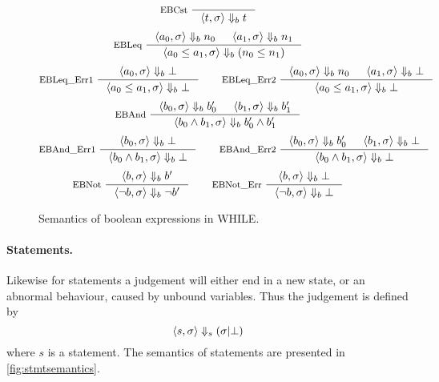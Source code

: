 \begin{figure}[h!]
\begin{equation*}
\inference[EBCst ]{}
{\judgeb{t,\sigma}{t}}
\end{equation*}
\begin{equation*}
\inference[EBLeq ]{\judgeb{a_0,\sigma}{n_0} & \judgeb{a_1,\sigma}{n_1}}
{\judgeb{a_0 \leq a_1 ,\sigma}{(n_0 \leq n_1)}}
\end{equation*}
\begin{equation*}
\inference[EBLeq\_Err1 ]{\judgeb{a_0,\sigma}{\bot}}
{\judgeb{a_0 \leq a_1, \sigma}{\bot}}
\qquad
\inference[EBLeq\_Err2 ]{\judgeb{a_0,\sigma}{n_0} & \judgeb{a_1,\sigma}{\bot}}
{\judgeb{a_0 \leq a_1, \sigma}{\bot}}
\end{equation*}
\begin{equation*}
\inference[EBAnd ]{\judgeb{b_0, \sigma}{b_0'} & \judgeb{b_1, \sigma}{b_1'}}
{\judgeb{b_0 \land b_1, \sigma}{b_0' \land b_1'}}
\end{equation*}
\begin{equation*}
\inference[EBAnd\_Err1 ]{\judgeb{b_0, \sigma}{\bot}}
{\judgeb{b_0 \land b_1, \sigma}{\bot}}
\qquad
\inference[EBAnd\_Err2 ]{\judgeb{b_0, \sigma}{b_0'} & \judgeb{b_1, \sigma}{\bot}}
{\judgeb{b_0 \land b_1, \sigma}{\bot}}
\end{equation*}
\begin{equation*}
\inference[EBNot ]{\judgeb{b,\sigma}{b'}}
{\judgeb{ \neg b, \sigma}{\neg b'}}
\qquad
\inference[EBNot\_Err ]{\judgeb{b,\sigma}{\bot}}
{\judgeb{ \neg b, \sigma}{\bot}}
\end{equation*}
\caption{Semantics of boolean expressions in WHILE.}
\label{fig:bexprsemantics}
\end{figure}

\paragraph{Statements.}\label{sec:stmtsemantics}
Likewise for statements a judgement will either end in a new state, or an abnormal behaviour, caused by unbound variables. Thus the judgement is defined by
$$\langle s, \sigma \rangle \Downarrow_{s} (\sigma | \bot)$$
where $s$ is a statement.
The semantics of statements are presented in \autoref{fig:stmtsemantics}.

